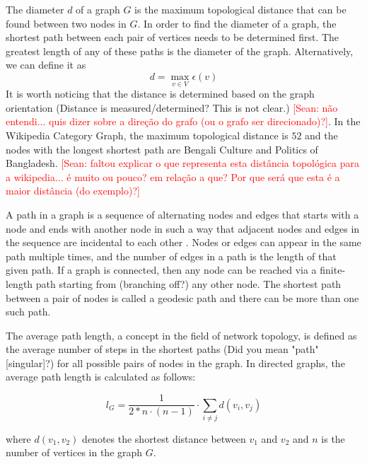 The diameter $d$ of a graph $G$ is the maximum topological distance that can be found between two nodes in $G$. In order to find the diameter of a graph, the shortest path between each pair of vertices needs to be determined first. The greatest length of any of these paths is the diameter of the graph. Alternatively, we can define it as 
\begin{equation}
d=\max _{v\in V}\epsilon (v)
\end{equation}
It is worth noticing that the distance is determined based on the graph orientation (Distance is measured/determined? This is not clear.) \textcolor{red}{[Sean: não entendi... quis dizer sobre a direção do grafo (ou o grafo ser direcionado)?]}. In the Wikipedia Category Graph, the maximum topological distance is $52$ and the nodes with the longest shortest path are Bengali Culture and Politics of Bangladesh. \textcolor{red}{[Sean: faltou explicar o que representa esta distância topológica para a wikipedia... é muito ou pouco? em relação a que? Por que será que esta é a maior distância (do exemplo)?]}

A path in a graph is a sequence of alternating nodes and edges that starts with a node and ends with another node in such a way that adjacent nodes and edges in the sequence are incidental to each other \cite{newman2010networks}. Nodes or edges can appear in the same path multiple times, and the number of edges in a path is the length of that given path. If a graph is connected, then any node can be reached via a finite-length path starting from (branching off?) any other node. The shortest path between a pair of nodes is called a geodesic path and there can be more than one such path.

The average path length, a concept in the field of network topology, is defined as the average number of steps in the shortest paths (Did you mean "path" [singular]?) for all possible pairs of nodes in the graph. In directed graphs, the average path length is calculated as follows:

\begin{equation}
l_{G}={\frac  {1}{2 * n\cdot (n-1)}}\cdot \sum _{{i\neq j}}d(v_{i},v_{j})
\end{equation}

where $d(v_{1},v_{2})$ denotes the shortest distance between $v_1$ and $v_2$ and $n$ is the number of vertices in the graph $G$. 

